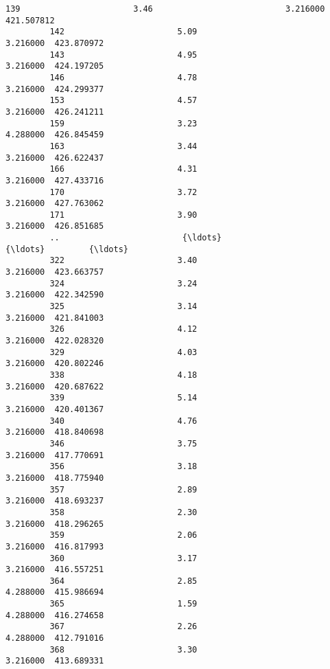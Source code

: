 \documentclass[11pt]{article}
\begin{document}
\begin{Verbatim}[commandchars=\\\{\}]
         139                       3.46                           3.216000  421.507812   
         142                       5.09                           3.216000  423.870972   
         143                       4.95                           3.216000  424.197205   
         146                       4.78                           3.216000  424.299377   
         153                       4.57                           3.216000  426.241211   
         159                       3.23                           4.288000  426.845459   
         163                       3.44                           3.216000  426.622437   
         166                       4.31                           3.216000  427.433716   
         170                       3.72                           3.216000  427.763062   
         171                       3.90                           3.216000  426.851685   
         ..                         {\ldots}                                {\ldots}         {\ldots}   
         322                       3.40                           3.216000  423.663757   
         324                       3.24                           3.216000  422.342590   
         325                       3.14                           3.216000  421.841003   
         326                       4.12                           3.216000  422.028320   
         329                       4.03                           3.216000  420.802246   
         338                       4.18                           3.216000  420.687622   
         339                       5.14                           3.216000  420.401367   
         340                       4.76                           3.216000  418.840698   
         346                       3.75                           3.216000  417.770691   
         356                       3.18                           3.216000  418.775940   
         357                       2.89                           3.216000  418.693237   
         358                       2.30                           3.216000  418.296265   
         359                       2.06                           3.216000  416.817993   
         360                       3.17                           3.216000  416.557251   
         364                       2.85                           4.288000  415.986694   
         365                       1.59                           4.288000  416.274658   
         367                       2.26                           4.288000  412.791016   
         368                       3.30                           3.216000  413.689331   

\end{Verbatim}
\end{document}

